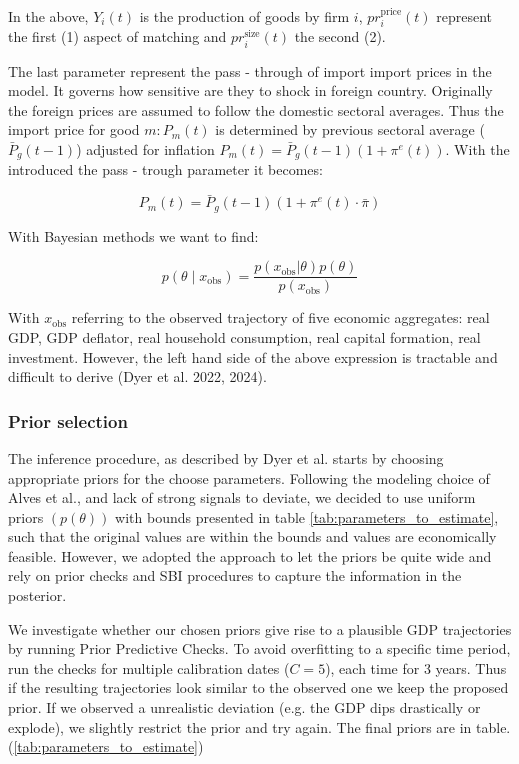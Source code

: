 \documentclass[12pt]{article}
\begin{document}
In the above, $Y_i(t)$ is the production of goods by firm $i$, $pr_i^\text{price}(t)$ represent the first (1) aspect of matching and $pr_i^{\text{size}}(t)$ the second (2). 

The last parameter represent the pass - through of import import prices in the model. It governs how sensitive are they to shock in foreign country. Originally the foreign prices are assumed to follow the domestic sectoral averages. Thus the import price for good $m: P_m(t)$ is determined by previous sectoral average ($\bar{P}_g(t - 1)$) adjusted for inflation $P_m(t) = \bar{P}_g(t - 1)(1 + \pi^e(t))$. With the introduced the pass - trough parameter it becomes:

\begin{equation}
    P_m(t) = \bar{P}_g(t - 1)( 1+ \pi^e(t) \cdot \bar{\pi} )
\end{equation}

With Bayesian methods we want to find:

\begin{equation}
    p(\theta \mid x_{\text{obs}}) = \frac{p(x_{\text{obs}} | \theta) p(\theta)}{p(x_{\text{obs}})}
\end{equation}

With $x_{\text{obs}}$ referring to the observed trajectory of five economic aggregates: real GDP, GDP deflator, real household consumption, real capital formation, real investment. However, the left hand side of the above expression is tractable and difficult to derive (Dyer et al. 2022, 2024). 

\subsubsection*{Prior selection}
The inference procedure, as described by Dyer et al. starts by choosing appropriate priors for the choose parameters. Following the modeling choice of Alves et al., and lack of strong signals to deviate, we decided to use uniform priors $(p(\theta))$ with bounds presented in table \ref{tab:parameters_to_estimate}, such that the original values are within the bounds and values are economically feasible. However, we adopted the approach to let the priors be quite wide and rely on prior checks and SBI procedures to capture the information in the posterior.

We investigate whether our chosen priors give rise to a plausible GDP trajectories by running Prior Predictive Checks. To avoid overfitting to a specific time period, run the checks for multiple calibration dates ($C = 5$), each time for 3 years. Thus if the resulting trajectories look similar to the observed one we keep the proposed prior. If we observed a unrealistic deviation (e.g. the GDP dips drastically or explode), we slightly restrict the prior and try again. The final priors are in table. (\ref{tab:parameters_to_estimate})
\end{document}
